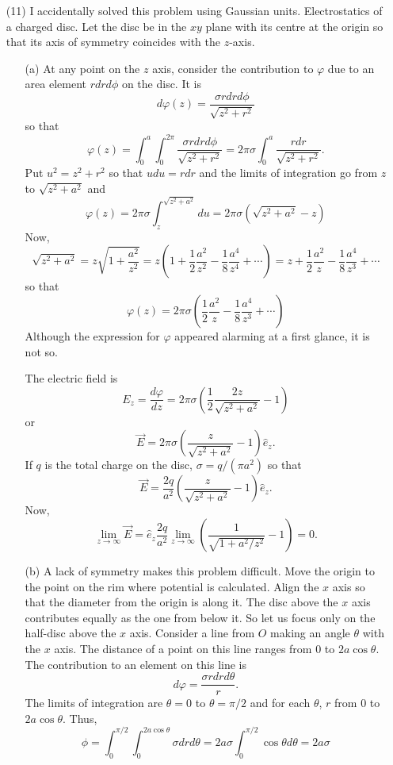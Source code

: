 \documentclass{article}
\newcommand{\uv}[1]{\hat{e}_{#1}}
\newcommand{\td}[2]{\frac{d{#1}}{d{#2}}}
\begin{document}
\begin{enumerate}
\item[(11)] {\color{red}I accidentally solved this problem using Gaussian units.}
Electrostatics of a charged disc. Let the disc be in the $xy$ plane with
its centre at the origin so that its axis of symmetry coincides with the $z$-axis.
\begin{enumerate}
\item[(a)] At any point on the $z$ axis, consider the contribution to $\varphi$ due
to an area element $rdrd\phi$ on the disc. It is
\[
d\varphi(z) = \frac{\sigma rdrd\phi}{\sqrt{z^2 + r^2}}
\]
so that
\[
\varphi(z) = \int_0^a\int_0^{2\pi}\frac{\sigma rdrd\phi}{\sqrt{z^2 + r^2}}
= 2\pi\sigma\int_0^a \frac{rdr}{\sqrt{z^2 + r^2}}.
\]
Put $u^2 = z^2 + r^2$ so that $udu = rdr$ and the limits of integration go
from $z$ to $\sqrt{z^2 + a^2}$ and
\[
\varphi(z) = 2\pi\sigma\int_z^{\sqrt{z^2 + a^2}} du = 2\pi\sigma(\sqrt{z^2 + a^2} - z)
\]
Now, 
\[
\sqrt{z^2 + a^2} = z\sqrt{1 + \frac{a^2}{z^2}} = z\left(1 + \frac{1}{2}\frac{a^2}{z^2}
- \frac{1}{8}\frac{a^4}{z^4} + \cdots\right) = z + \frac{1}{2}\frac{a^2}{z}
- \frac{1}{8}\frac{a^4}{z^3} + \cdots
\]
so that
\[
\varphi(z) = 2\pi\sigma\left(\frac{1}{2}\frac{a^2}{z} - \frac{1}{8}\frac{a^4}{z^3}
 + \cdots\right)
\]
Although the expression for $\varphi$ appeared alarming at a first glance, it is 
not so.

The electric field is
\[
E_z = \td{\varphi}{z} = 2\pi\sigma\left(\frac{1}{2}\frac{2z}{\sqrt{z^2 + a^2}} - 1\right)
\]
or
\[
\vec{E} = 2\pi\sigma\left(\frac{z}{\sqrt{z^2 + a^2}} - 1\right)\uv{z}.
\]
If $q$ is the total charge on the disc, $\sigma = q/(\pi a^2)$ so that
\[
\vec{E} = \frac{2q}{a^2}\left(\frac{z}{\sqrt{z^2 + a^2}} - 1\right)\uv{z}.
\]
Now,
\[
\lim_{z \rightarrow \infty}\vec{E} = \uv{z}\frac{2q}{a^2}\lim_{z \rightarrow \infty}
\left(\frac{1}{\sqrt{1 + a^2/z^2}} - 1\right) = 0.
\]

\item[(b)] A lack of symmetry makes this problem difficult. Move the origin to
the point on the rim where potential is calculated. Align the $x$ axis so that
the diameter from the origin is along it. The disc above the $x$ axis contributes
equally as the one from below it. So let us focus only on the half-disc above
the $x$ axis. Consider a line from $O$ making an angle $\theta$ with the $x$
axis. The distance of a point on this line ranges from $0$ to $2a\cos\theta$.
The contribution to an element on this line is
\[
d\varphi = \frac{\sigma rdrd\theta}{r}.
\]
The limits of integration are $\theta = 0$ to $\theta = \pi/2$ and for each
$\theta$, $r$ from $0$ to $2a\cos\theta$. Thus,
\[
\phi = \int_0^{\pi/2}\int_0^{2a\cos\theta}\sigma dr d\theta = 2a\sigma
\int_0^{\pi/2} \cos\theta d\theta = 2a\sigma
\]
\end{enumerate}


\end{enumerate}
\end{document}
